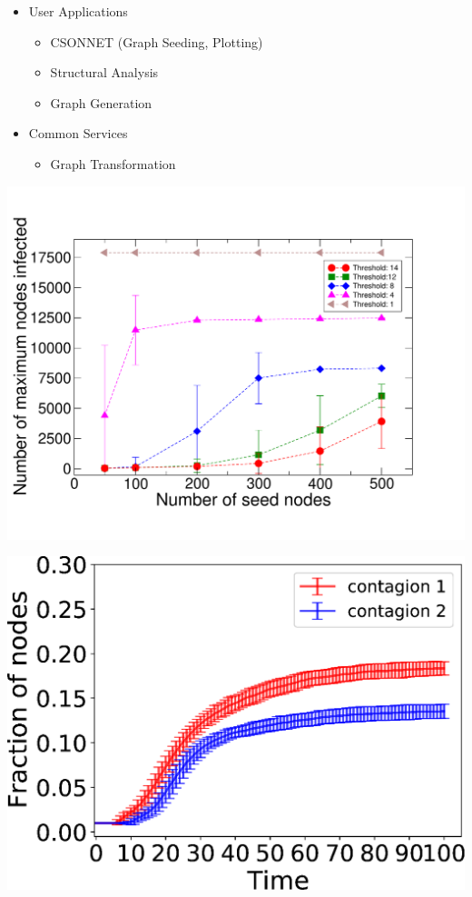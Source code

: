 \documentclass[landscape,paperwidth=70in,paperheight=46in,fontscale=0.225]{baposter} %
\begin{document}
\begin{poster}
{\begin{minipage}{0.4\linewidth}
\begin{itemize}[leftmargin=*,noitemsep,topsep=0pt]
\item User Applications
	\begin{itemize}
	\item CSONNET (Graph Seeding, Plotting)
	\item Structural Analysis
	\item Graph Generation
	\end{itemize}
\item Common Services
	\begin{itemize}
	\item Graph Transformation
	\end{itemize}
\end{itemize}
\end{minipage}         
\hfill
\begin{minipage}{0.6\linewidth}
\includegraphics[scale=0.2]{figures/astroph_threshold_cs.pdf} 
\end{minipage}
\begin{minipage}{0.45\linewidth}
\includegraphics[scale=0.27]{figures/danville_asym_interaction_100ns_fraction_cum_errorbar.eps} 

\end{minipage}}
\end{poster}
\end{document}
